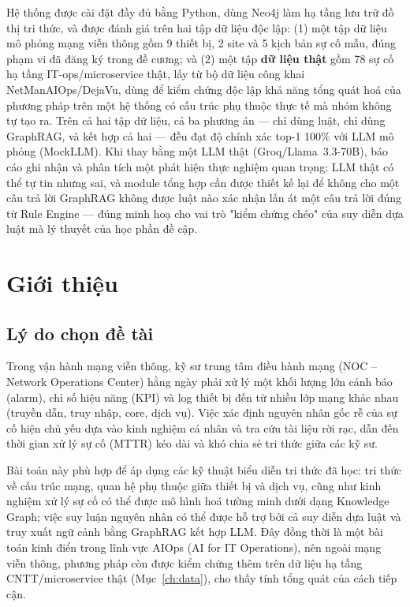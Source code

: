\documentclass[12pt,a4paper]{report}
\begin{document}
Hệ thống được cài đặt đầy đủ bằng Python, dùng Neo4j làm hạ tầng lưu trữ đồ thị tri thức, và được
đánh giá trên hai tập dữ liệu độc lập: (1) một tập dữ liệu mô phỏng mạng viễn thông gồm 9 thiết bị,
2 site và 5 kịch bản sự cố mẫu, đúng phạm vi đã đăng ký trong đề cương; và (2) một tập
\textbf{dữ liệu thật} gồm 78 sự cố hạ tầng IT-ops/microservice thật, lấy từ bộ dữ liệu công khai
NetManAIOps/DejaVu, dùng để kiểm chứng độc lập khả năng tổng quát hoá của phương pháp trên một hệ
thống có cấu trúc phụ thuộc thực tế mà nhóm không tự tạo ra. Trên cả hai tập dữ liệu, cả ba
phương án --- chỉ dùng luật, chỉ dùng GraphRAG, và kết hợp cả hai --- đều đạt độ chính xác top-1
100\% với LLM mô phỏng (MockLLM). Khi thay bằng một LLM thật (Groq/Llama~3.3-70B), báo cáo ghi
nhận và phân tích một phát hiện thực nghiệm quan trọng: LLM thật có thể tự tin nhưng sai, và module
tổng hợp cần được thiết kế lại để không cho một câu trả lời GraphRAG không được luật nào xác nhận
lấn át một câu trả lời đúng từ Rule Engine --- đúng minh hoạ cho vai trò "kiểm chứng chéo" của suy
diễn dựa luật mà lý thuyết của học phần đề cập.

\chapter{Giới thiệu}

\section{Lý do chọn đề tài}

Trong vận hành mạng viễn thông, kỹ sư trung tâm điều hành mạng (NOC -- Network Operations Center)
hằng ngày phải xử lý một khối lượng lớn cảnh báo (alarm), chỉ số hiệu năng (KPI) và log thiết bị
đến từ nhiều lớp mạng khác nhau (truyền dẫn, truy nhập, core, dịch vụ). Việc xác định nguyên nhân
gốc rễ của sự cố hiện chủ yếu dựa vào kinh nghiệm cá nhân và tra cứu tài liệu rời rạc, dẫn đến thời
gian xử lý sự cố (MTTR) kéo dài và khó chia sẻ tri thức giữa các kỹ sư.

Bài toán này phù hợp để áp dụng các kỹ thuật biểu diễn tri thức đã học: tri thức về cấu trúc mạng,
quan hệ phụ thuộc giữa thiết bị và dịch vụ, cũng như kinh nghiệm xử lý sự cố có thể được mô hình
hoá tường minh dưới dạng Knowledge Graph; việc suy luận nguyên nhân có thể được hỗ trợ bởi cả suy
diễn dựa luật và truy xuất ngữ cảnh bằng GraphRAG kết hợp LLM. Đây đồng thời là một bài toán kinh
điển trong lĩnh vực AIOps (AI for IT Operations), nên ngoài mạng viễn thông, phương pháp còn được
kiểm chứng thêm trên dữ liệu hạ tầng CNTT/microservice thật (Mục~\ref{ch:data}), cho thấy tính tổng
quát của cách tiếp cận.
\end{document}
